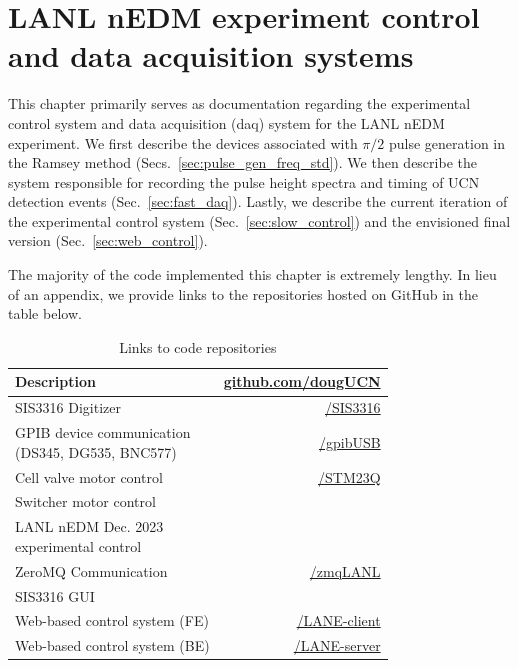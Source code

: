 
\chapter{LANL nEDM experiment control and data acquisition systems}\label{chap:daq}


This chapter primarily serves as documentation regarding the experimental control system and data acquisition (\acrshort*{daq}) system for the LANL nEDM experiment. We first describe the devices associated with $\pi/2$ pulse generation in the Ramsey method (Secs.~\ref{sec:pulse_gen_freq_std}). We then describe the system responsible for recording the pulse height spectra and timing of UCN detection events (Sec.~\ref{sec:fast_daq}). Lastly, we describe the current iteration of the experimental control system (Sec.~\ref{sec:slow_control}) and the envisioned final version (Sec.~\ref{sec:web_control}).

The majority of the code implemented this chapter is extremely lengthy. In lieu of an appendix, we provide links to the repositories hosted on GitHub in the table below.

\begin{table}[htp]
\renewcommand*{\arraystretch}{2}
\centering
\caption{Links to code repositories}\label{tb:github}
\begin{tabular}{
    l
    r
}
\toprule
Description & \href{https://github.com/dougUCN/}{github.com/dougUCN} \\
\midrule
SIS3316 Digitizer  & \href{https://github.com/dougUCN/SIS3316}{/SIS3316} \\
\makecell[l]{GPIB device communication\\(DS345, DG535, BNC577)} & \href{https://github.com/dougUCN/gpibUSB}{/gpibUSB} \\
Cell valve motor control & \href{https://github.com/dougUCN/STM23Q}{/STM23Q} \\
Switcher motor control &  \\
\makecell[l]{LANL nEDM Dec. 2023\\experimental control} & \\
ZeroMQ Communication & \href{https://github.com/dougUCN/zmqLANL}{/zmqLANL} \\
SIS3316 GUI & \\
Web-based control system (FE) & \href{https://github.com/dougUCN/LANE-client}{/LANE-client} \\
Web-based control system (BE) & \href{https://github.com/dougUCN/LANE-server}{/LANE-server} \\
\bottomrule
\end{tabular}
\end{table}


